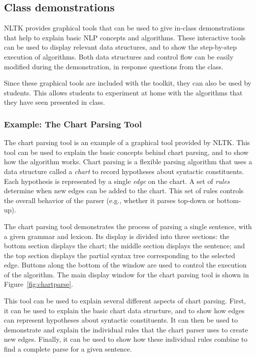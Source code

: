 \documentclass[11pt]{article}
\begin{document}
\subsection{Class demonstrations}

NLTK provides graphical tools that can be used to give in-class
demonstrations that help to explain basic NLP concepts and algorithms.
These interactive tools can be used to display relevant data
structures, and to show the step-by-step execution of algorithms.
Both data structures and control flow can be easily modified during
the demonstration, in response questions from the class.

Since these graphical tools are included with the toolkit, they can
also be used by students.  This allows students to experiment at home
with the algorithms that they have seen presented in class.

\subsubsection*{Example: The Chart Parsing Tool}

The chart parsing tool is an example of a graphical tool provided by
NLTK.  This tool can be used to explain the basic concepts behind
chart parsing, and to show how the algorithm works.  Chart parsing is
a flexible parsing algorithm that uses a data structure called a
\emph{chart} to record hypotheses about syntactic constituents.  Each
hypothesis is represented by a single \emph{edge} on the chart.  A set
of \emph{rules} determine when new edges can be added to the chart.
This set of rules controls the overall behavior of the parser (e.g.,
whether it parses top-down or bottom-up).

The chart parsing tool demonstrates the process of parsing a single
sentence, with a given grammar and lexicon.  Its display is divided
into three sections: the bottom section displays the chart; the middle
section displays the sentence; and the top section displays the
partial syntax tree corresponding to the selected edge.  Buttons along
the bottom of the window are used to control the execution of the
algorithm.  The main display window for the chart parsing tool is
shown in Figure~\ref{fig:chartparse}.   

This tool can be used to explain several different aspects of chart
parsing.  First, it can be used to explain the basic chart data
structure, and to show how edges can represent hypotheses about
syntactic constituents.  It can then be used to demonstrate and
explain the individual rules that the chart parser uses to create new
edges.  Finally, it can be used to show how these individual rules
combine to find a complete parse for a given sentence.
\end{document}

